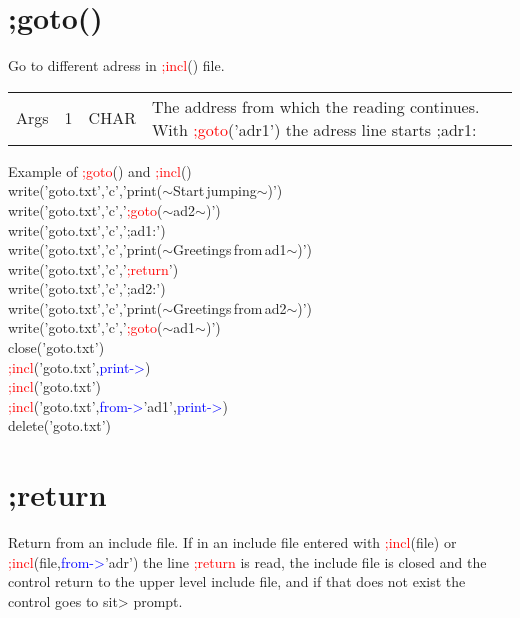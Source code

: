 \section{;goto()}
\label{inpugoto}
Go to different adress in \textcolor{Red}{;incl}() file.
\begin{table}[H]
\begin{tabular}{ m{}  m{}m{}p{}}
Args&1&CHAR& The address from which the reading continues. With \textcolor{Red}{;goto}('adr1')
 the adress line starts ;adr1:
\\ \cline{1-4}
\end{tabular}
\end{table}
\begin{example}[inpugotoex]Example of \textcolor{Red}{;goto}() and \textcolor{Red}{;incl}()\\
\label{inpugotoex}
\textcolor{VioletRed}{write}('goto.txt','c','\textcolor{VioletRed}{print}($\sim$Start\,jumping$\sim$)')\\
\textcolor{VioletRed}{write}('goto.txt','c','\textcolor{Red}{;goto}($\sim$ad2$\sim$)')\\
\textcolor{VioletRed}{write}('goto.txt','c',';ad1:')\\
\textcolor{VioletRed}{write}('goto.txt','c','\textcolor{VioletRed}{print}($\sim$Greetings\,from\,ad1$\sim$)')\\
\textcolor{VioletRed}{write}('goto.txt','c','\textcolor{Red}{;return}')\\
\textcolor{VioletRed}{write}('goto.txt','c',';ad2:')\\
\textcolor{VioletRed}{write}('goto.txt','c','\textcolor{VioletRed}{print}($\sim$Greetings\,from\,ad2$\sim$)')\\
\textcolor{VioletRed}{write}('goto.txt','c','\textcolor{Red}{;goto}($\sim$ad1$\sim$)')\\
\textcolor{VioletRed}{close}('goto.txt')\\
\textcolor{Red}{;incl}('goto.txt',\textcolor{blue}{print->})\\
\textcolor{Red}{;incl}('goto.txt')\\
\textcolor{Red}{;incl}('goto.txt',\textcolor{blue}{from->}'ad1',\textcolor{blue}{print->})\\
delete('goto.txt')
\end{example}
\section{;return}
\label{inpureturn}
 Return from an include file.
If in an include file entered with \textcolor{Red}{;incl}(file) or \textcolor{Red}{;incl}(file,\textcolor{blue}{from->}'adr')
 the line \textcolor{Red}{;return} is read, the include file is closed and the control return
to the upper level include file, and if that does not exist
the control goes to sit> prompt.
